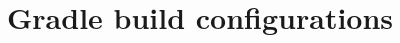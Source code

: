\begin{comment}
            \textbf{Q16: How likely are you to} &  &  &  &  &  &  &  &  &  &  \\
            & 0 & 1 & 2 & 3 & 4 & 5 & 6 & 7 & 8 & 9 & 10 \\ \hline
            1. Recommend low-level automated testing for colleague as a software development practice? & 0 & 0 & 0 & 0 & 0 & 0 & 0 & 0 & B & 0 & AC \\
            2. Recommend testing framework JUnit for future Spring projects where you take part in existing project? & 0 & 0 & 0 & 0 & 0 & 0 & 0 & C & 0 & B & A \\
            3. Take testing framework JUnit in use for future Spring projects where you have technical lead role in a new starting project? & 0 & 0 & 0 & 0 & 0 & 0 & 0 & 0 & C & B & A \\
            & \\ \hline

            \end{tabular}}
            \caption {NPS questions with response data about developer loyalty towards low-level automated testing with JUnit } \label{tab:junit-pt3-ans}

    \end{table}
    \clearpage
\end{comment}
\restoregeometry

\chapter{Gradle build configurations}
\label{chapter:gradle-build}

